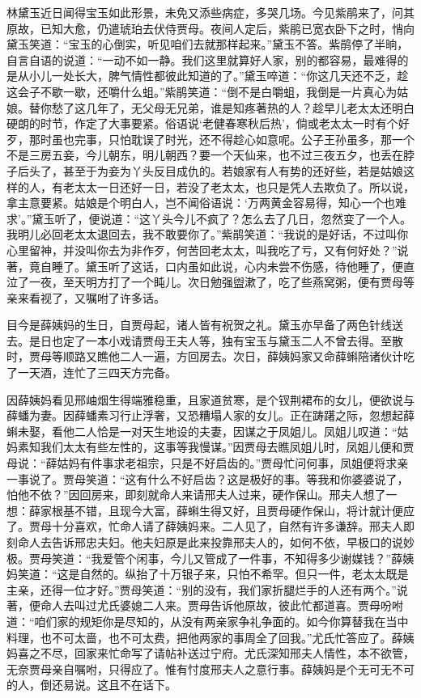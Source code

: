 \begin{parag}
    林黛玉近日闻得宝玉如此形景，未免又添些病症，多哭几场。今见紫鹃来了，问其原故，已知大愈，仍遣琥珀去伏侍贾母。夜间人定后，紫鹃已宽衣卧下之时，悄向黛玉笑道：“宝玉的心倒实，听见咱们去就那样起来。”黛玉不答。紫鹃停了半晌，自言自语的说道：“一动不如一静。我们这里就算好人家，别的都容易，最难得的是从小儿一处长大，脾气情性都彼此知道的了。”黛玉啐道：“你这几天还不乏，趁这会子不歇一歇，还嚼什么蛆。”紫鹃笑道：“倒不是白嚼蛆，我倒是一片真心为姑娘。替你愁了这几年了，无父母无兄弟，谁是知疼著热的人？趁早儿老太太还明白硬朗的时节，作定了大事要紧。俗语说‘老健春寒秋后热’，倘或老太太一时有个好歹，那时虽也完事，只怕耽误了时光，还不得趁心如意呢。公子王孙虽多，那一个不是三房五妾，今儿朝东，明儿朝西？要一个天仙来，也不过三夜五夕，也丢在脖子后头了，甚至于为妾为丫头反目成仇的。若娘家有人有势的还好些，若是姑娘这样的人，有老太太一日还好一日，若没了老太太，也只是凭人去欺负了。所以说，拿主意要紧。姑娘是个明白人，岂不闻俗语说：‘万两黄金容易得，知心一个也难求’。”黛玉听了，便说道：“这丫头今儿不疯了？怎么去了几日，忽然变了一个人。我明儿必回老太太退回去，我不敢要你了。”紫鹃笑道：“我说的是好话，不过叫你心里留神，并没叫你去为非作歹，何苦回老太太，叫我吃了亏，又有何好处？”说著，竟自睡了。黛玉听了这话，口内虽如此说，心内未尝不伤感，待他睡了，便直泣了一夜，至天明方打了一个盹儿。次日勉强盥漱了，吃了些燕窝粥，便有贾母等亲来看视了，又嘱咐了许多话。
\end{parag}


\begin{parag}
    目今是薛姨妈的生日，自贾母起，诸人皆有祝贺之礼。黛玉亦早备了两色针线送去。是日也定了一本小戏请贾母王夫人等，独有宝玉与黛玉二人不曾去得。至散时，贾母等顺路又瞧他二人一遍，方回房去。次日，薛姨妈家又命薛蝌陪诸伙计吃了一天酒，连忙了三四天方完备。
\end{parag}


\begin{parag}
    因薛姨妈看见邢岫烟生得端雅稳重，且家道贫寒，是个钗荆裙布的女儿，便欲说与薛蟠为妻。因薛蟠素习行止浮奢，又恐糟塌人家的女儿。正在踌躇之际，忽想起薛蝌未娶，看他二人恰是一对天生地设的夫妻，因谋之于凤姐儿。凤姐儿叹道：“姑妈素知我们太太有些左性的，这事等我慢谋。”因贾母去瞧凤姐儿时，凤姐儿便和贾母说：“薛姑妈有件事求老祖宗，只是不好启齿的。”贾母忙问何事，凤姐便将求亲一事说了。贾母笑道：“这有什么不好启齿？这是极好的事。等我和你婆婆说了，怕他不依？”因回房来，即刻就命人来请邢夫人过来，硬作保山。邢夫人想了一想：薛家根基不错，且现今大富，薛蝌生得又好，且贾母硬作保山，将计就计便应了。贾母十分喜欢，忙命人请了薛姨妈来。二人见了，自然有许多谦辞。邢夫人即刻命人去告诉邢忠夫妇。他夫妇原是此来投靠邢夫人的，如何不依，早极口的说妙极。贾母笑道：“我爱管个闲事，今儿又管成了一件事，不知得多少谢媒钱？”薛姨妈笑道：“这是自然的。纵抬了十万银子来，只怕不希罕。但只一件，老太太既是主亲，还得一位才好。”贾母笑道：“别的没有，我们家折腿烂手的人还有两个。”说著，便命人去叫过尤氏婆媳二人来。贾母告诉他原故，彼此忙都道喜。贾母吩咐道：“咱们家的规矩你是尽知的，从没有两亲家争礼争面的。如今你算替我在当中料理，也不可太啬，也不可太费，把他两家的事周全了回我。”尤氏忙答应了。薛姨妈喜之不尽，回家来忙命写了请帖补送过宁府。尤氏深知邢夫人情性，本不欲管，无奈贾母亲自嘱咐，只得应了。惟有忖度邢夫人之意行事。薛姨妈是个无可无不可的人，倒还易说。这且不在话下。
\end{parag}


